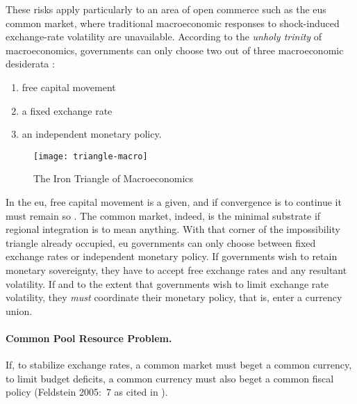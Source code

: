 These risks apply particularly to an area of open commerce such as the \gls{eu}s common market, where traditional macroeconomic responses to shock-induced exchange-rate volatility are unavailable.
According to the \emph{unholy trinity} of macroeconomics, governments can only choose two out of three macroeconomic desiderata \citep{Mundell1963,Fleming1962}:
\begin{enumerate}
	\item free capital movement
	\item a fixed exchange rate
	\item an independent monetary policy.
\end{enumerate}

 \begin{figure}[htbp]
	\centering
	\texttt{[image: triangle-macro]}
	\caption{The Iron Triangle of Macroeconomics}
	\label{fig:triangle-macro}
\end{figure}

In the \gls{eu}, free capital movement is a given, and if convergence is to continue it must remain so \citep{Abiad2007}.
The common market, indeed, is the minimal substrate if regional integration is to mean anything.
With that corner of the impossibility triangle already occupied, \gls{eu} governments can only choose between fixed exchange rates or independent monetary policy.
If governments wish to retain monetary sovereignty, they have to accept free exchange rates and any resultant volatility.
If and to the extent that governments wish to limit exchange rate volatility, they \emph{must} coordinate their monetary policy, that is, enter a currency union.

\paragraph[Fiscal-CPR]{Common Pool Resource Problem.}
	\label{sec:Fiscal-CPR}
If, to stabilize exchange rates, a common market must beget a common currency, to limit budget deficits, a common currency must also beget a common fiscal policy (Feldstein 2005:~7 as cited in \citealt[13]{Begg2008}).

